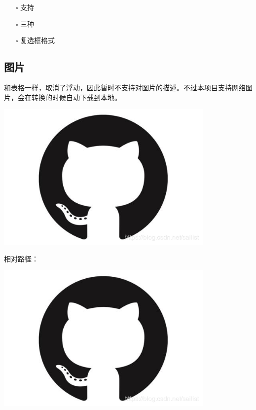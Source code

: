 \documentclass[UTF8]{ctexart}
\newenvironment{marktext}{}{}
\begin{document}
\begin{itemize}
\item[\rlap{\raisebox{0.3ex}{\hspace{0.4ex}\tiny \ding{52}}}$\square$]
支持
\item[\rlap{\raisebox{0.3ex}{\hspace{0.4ex}\scriptsize \ding{56}}}$\square$]
三种
\item[$\square$]
复选框格式
\end{itemize}
\begin{marktext}


\subsection{图片}


和表格一样，取消了浮动，因此暂时不支持对图片的描述。不过本项目支持网络图片，会在转换的时候自动下载到本地。


\begin{center}
\begin{marktext}
\vspace{\baselineskip}\includegraphics[width=0.8\textwidth]{images/1c59f8ef2aa3c5e527a22b7c258489d6.png}\vspace{\baselineskip}
\end{marktext}
\end{center}


相对路径：
\begin{center}
\begin{marktext}
\vspace{\baselineskip}\includegraphics[width=0.8\textwidth]{images/17d353012390f9f83be4ee990a4dfbdc.png}\vspace{\baselineskip}
\end{marktext}
\end{center}



\end{marktext}
\end{document}
